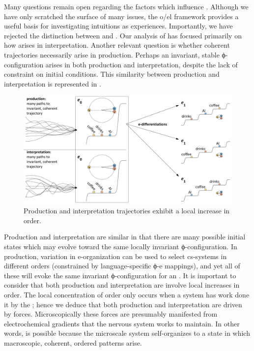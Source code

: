   Many questions remain open regarding the factors which influence . Although we have only scratched the surface of many issues, the o/el framework provides a useful basis for investigating intuitions as experiences. Importantly, we have rejected the distinction between  and . Our analysis of  has focused primarily on how  arises in interpretation. Another relevant question is whether coherent trajectories necessarily arise in production. Perhaps an invariant, stable ϕ-configuration arises in both production and interpretation, despite the lack of constraint on initial conditions. This similarity between production and interpretation is represented in {}.

  
\begin{figure}
\includegraphics[width=\textwidth]{figures/Tilsen-img135.png}
\caption{Production and interpretation trajectories exhibit a local increase in order.}
\label{fig:6:16}
\end{figure}
 

  Production and interpretation are similar in that there are many possible initial states which may evolve toward the same locally invariant ϕ-configuration. In production, variation in e-organization can be used to select cs-systems in different orders (constrained by language-specific ϕ-e mappings), and yet all of these will evoke the same invariant ϕ-configuration for an . It is important to consider that both production and interpretation are involve local increases in order. The local concentration of order only occurs when a system has work done it by the ; hence we deduce that both production and interpretation are driven by  forces. Microscopically these forces are presumably manifested from electrochemical gradients that the nervous system works to maintain. In other words,  is possible because the microscale system self-organizes to a state in which macroscopic, coherent, ordered patterns arise.


